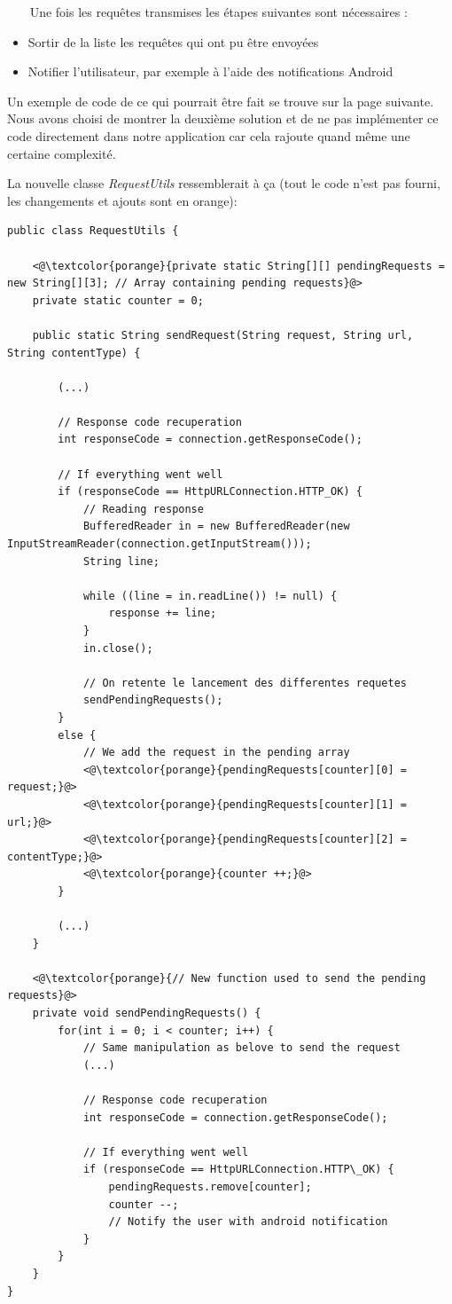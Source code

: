 \documentclass[12pt]{article}
\begin{document}
~~~ \textcolor{pgreen}{Une fois les requêtes transmises les étapes suivantes sont nécessaires :} 

\begin{itemize}[resume]
\item Sortir de la liste les requêtes qui ont pu être envoyées
\item Notifier l'utilisateur, par exemple à l'aide des notifications Android \\
\end{itemize}

Un exemple de code de ce qui pourrait être fait se trouve sur la page suivante. Nous avons choisi de montrer la deuxième solution et de ne pas implémenter ce code directement dans notre application car cela rajoute quand même une certaine complexité.

\clearpage
La nouvelle classe \emph{RequestUtils} ressemblerait à ça (tout le code n'est pas fourni, les changements et ajouts sont en orange): \\

\begin{lstlisting}[style=java]
public class RequestUtils {

	<@\textcolor{porange}{private static String[][] pendingRequests = new String[][3]; // Array containing pending requests}@>
	private static counter = 0;
	
	public static String sendRequest(String request, String url, String contentType) {

		(...)      
            
		// Response code recuperation
		int responseCode = connection.getResponseCode();

		// If everything went well
		if (responseCode == HttpURLConnection.HTTP_OK) {		
			// Reading response
			BufferedReader in = new BufferedReader(new InputStreamReader(connection.getInputStream()));
			String line;

			while ((line = in.readLine()) != null) {
				response += line;
			}
			in.close();
                
			// On retente le lancement des differentes requetes
			sendPendingRequests();
		} 
		else {
			// We add the request in the pending array
			<@\textcolor{porange}{pendingRequests[counter][0] = request;}@>
			<@\textcolor{porange}{pendingRequests[counter][1] = url;}@>
			<@\textcolor{porange}{pendingRequests[counter][2] = contentType;}@>
			<@\textcolor{porange}{counter ++;}@>
		}

		(...)
	}
	
	<@\textcolor{porange}{// New function used to send the pending requests}@>
	private void sendPendingRequests() {
		for(int i = 0; i < counter; i++) {
			// Same manipulation as belove to send the request
			(...) 
			
			// Response code recuperation
			int responseCode = connection.getResponseCode();
			
			// If everything went well
			if (responseCode == HttpURLConnection.HTTP\_OK) {
				pendingRequests.remove[counter];
				counter --;
				// Notify the user with android notification
			}
		}
	}
}

\end{lstlisting}
\end{document}
